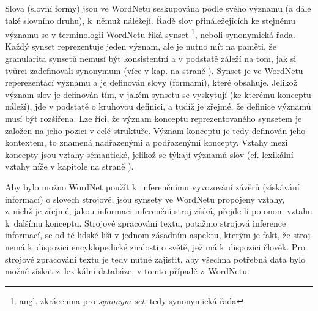 \documentclass[a4paper, 11pt, oneside, showtrims]{book}
\newcommand{\itNameRef}[1]{\textit{\nameref{#1}}}
\begin{document}
					Slova (slovní formy) jsou ve WordNetu seskupována podle svého významu (a dále také slovního druhu), k~němuž náležejí. Řadě slov přináležejících ke stejnému významu se v terminologii WordNetu říká synset \footnote{angl. zkrácenina pro \textit{synonym set}, tedy synonymická řada}, neboli synonymická řada. Každý synset reprezentuje jeden význam, ale je nutno mít na paměti, že granularita synsetů nemusí být konsistentní a v podstatě záleží na tom, jak si tvůrci zadefinovali synonymum (více v kap. \itNameRef{cha:synon} na straně \pageref{cha:synon}). Synset je ve WordNetu reperezentací významu a je definován slovy (formami), které obsahuje. Jelikož význam slov je definován tím, v jakém synsetu se vyskytují (ke kterému konceptu náleží), jde v podstatě o kruhovou definici, a tudíž je zřejmé, že definice významů musí být rozšířena. Lze říci, že význam konceptu reprezentovaného synsetem je založen na jeho pozici v celé struktuře. Význam konceptu je tedy definován jeho kontextem, to znamená nadřazenými a podřazenými koncepty. \parencite{kamps2002visualizing} Vztahy mezi koncepty jsou vztahy sémantické, jelikož se týkají významů slov (cf. lexikální vztahy níže v kapitole \itNameRef{cha:lexvztah} na straně \pageref{cha:lexvztah}). 

					Aby bylo možno WordNet použít k~inferenčnímu vyvozování závěrů (získávání informací) o slovech strojově, jsou synsety ve WordNetu propojeny vztahy, z~nichž je zřejmé, jakou informaci inferenční stroj získá, přejde-li po onom vztahu k~dalšímu konceptu. Strojové zpracování textu, potažmo strojová inference informací, se od té lidské liší v jednom zásadním aspektu, kterým je fakt, že stroj nemá k~dispozici encyklopedické znalosti o světě, jež má k~dispozici člověk. Pro strojové zpracování textu je tedy nutné zajistit, aby všechna potřebná data bylo možné získat z~lexikální databáze, v tomto případě z~WordNetu.
\end{document}

